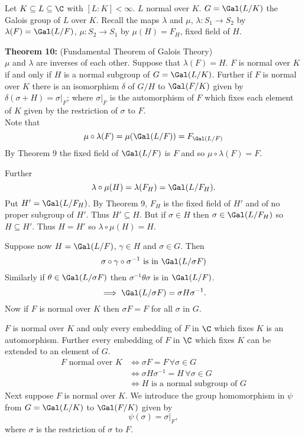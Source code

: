 Let $K\subseteq L\subseteq\C$ with $[L:K]<\infty$.  $L$ normal over $K$.  $G=\Gal(L/K)$ the Galois group of $L$ over $K$.  Recall the maps $\lambda$ and $\mu$, $\lambda\colon S_1\to S_2$ by $\lambda(F)=\Gal(L/F)$, $\mu\colon S_2\to S_1$ by $\mu(H)=F_H$, fixed field of $H$.

\textbf{Theorem 10:} (Fundamental Theorem of Galois Theory) \\
$\mu$ and $\lambda$ are inverses of each other.  Suppose that $\lambda(F)=H$.  $F$ is normal over $K$ if and only if $H$ is a normal subgroup of $G=\Gal(L/K)$.  Further if $F$ is normal over $K$ there is an isomorphism $\delta$ of $G/H$ to $\Gal(F/K)$ given by $\delta(\sigma+H)=\sigma|_F$; where $\sigma|_F$ is the automorphism of $F$ which fixes each element of $K$ given by the restriction of $\sigma$ to $F$. \\
\pf Note that
\[ \mu\circ\lambda(F) = \mu(\Gal(L/F)) = F_{\Gal(L/F)} \]
By Theorem 9 the fixed field of $\Gal(L/F)$ is $F$ and so $\mu\circ\lambda(F)=F$.

Further
\[ \lambda\circ\mu(H) = \lambda(F_H) = \Gal(L/F_H) . \]
Put $H'=\Gal(L/F_H)$.  By Theorem 9, $F_H$ is the fixed field of $H'$ and of no proper subgroup of $H'$.  Thus $H'\subseteq H$.  But if $\sigma\in H$ then $\sigma\in\Gal(L/F_H)$ so $H\subseteq H'$.  Thus $H=H'$ so $\lambda\circ\mu(H)=H$.

Suppose now $H=\Gal(L/F)$, $\gamma\in H$ and $\sigma\in G$.  Then
\[ \sigma\circ\gamma\circ\sigma^{-1} \text{ is in } \Gal(L/\sigma F) \]
Similarly if $\theta\in\Gal(L/\sigma F)$ then $\sigma^{-1}\theta\sigma$ is in $\Gal(L/F)$.
\[ \implies \Gal(L/\sigma F) = \sigma H \sigma^{-1} . \]
Now if $F$ is normal over $K$ then $\sigma F=F$ for all $\sigma$ in $G$.

$F$ is normal over $K$ and only every embedding of $F$ in $\C$ which fixes $K$ is an automorphism.  Further every embedding of $F$ in $\C$ which fixes $K$ can be extended to an element of $G$.
\begin{align*}
F\text{ normal over $K$} &\iff \sigma F=F\,\forall\sigma\in G \\
&\iff \sigma H\sigma^{-1}=H\,\forall\sigma\in G \\
&\iff \text{$H$ is a normal subgroup of $G$}
\end{align*}
Next suppose $F$ is normal over $K$.  We introduce the group homomorphism in $\psi$ from $G=\Gal(L/K)$ to $\Gal(F/K)$ given by
\[ \psi(\sigma) = \sigma|_F , \]
where $\sigma$ is the restriction of $\sigma$ to $F$.

